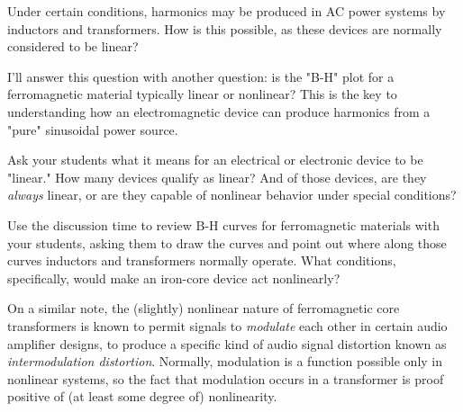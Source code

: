 

Under certain conditions, harmonics may be produced in AC power systems by inductors and transformers.  How is this possible, as these devices are normally considered to be linear?







I'll answer this question with another question: is the "B-H" plot for a ferromagnetic material typically linear or nonlinear?  This is the key to understanding how an electromagnetic device can produce harmonics from a "pure" sinusoidal power source.







Ask your students what it means for an electrical or electronic device to be "linear."  How many devices qualify as linear?  And of those devices, are they {\it always} linear, or are they capable of nonlinear behavior under special conditions?

Use the discussion time to review B-H curves for ferromagnetic materials with your students, asking them to draw the curves and point out where along those curves inductors and transformers normally operate.  What conditions, specifically, would make an iron-core device act nonlinearly?

On a similar note, the (slightly) nonlinear nature of ferromagnetic core transformers is known to permit signals to {\it modulate} each other in certain audio amplifier designs, to produce a specific kind of audio signal distortion known as {\it intermodulation distortion}.  Normally, modulation is a function possible only in nonlinear systems, so the fact that modulation occurs in a transformer is proof positive of (at least some degree of) nonlinearity.




